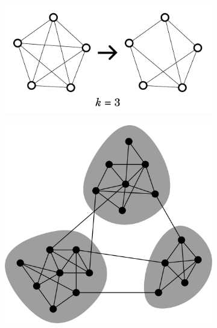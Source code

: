 \begin{figure}
  \begin{subfigure}[t]{0.45\textwidth}
  \centering
    \includegraphics[width=\linewidth]{pruning}
    \caption{
    }
    \label{fig:analysis-clustering-modclust-prune}
  \end{subfigure}%
  \begin{subfigure}[t]{0.45\textwidth}
  \centering
    \includegraphics[width=\linewidth]{newmanModularityCommunityStructure2006_1}
    \caption{
    }
    \label{fig:analysis-clustering-modclust-modclust}
  \end{subfigure}


\end{figure}
